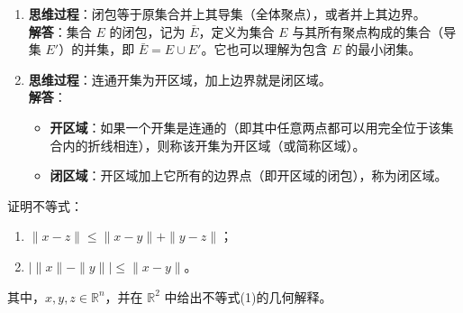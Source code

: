 \documentclass[lang=cn,11pt]{elegantbook}
\begin{document}
\begin{solution}
\begin{enumerate}
  \item[(6)] \textbf{思维过程}：闭包等于原集合并上其导集（全体聚点），或者并上其边界。\\
  \textbf{解答}：集合 $E$ 的闭包，记为 $\bar{E}$，定义为集合 $E$ 与其所有聚点构成的集合（导集 $E'$）的并集，即 $\bar{E} = E \cup E'$。它也可以理解为包含 $E$ 的最小闭集。

  \item[(7)] \textbf{思维过程}：连通开集为开区域，加上边界就是闭区域。\\
  \textbf{解答}：
  \begin{itemize}
    \item \textbf{开区域}：如果一个开集是连通的（即其中任意两点都可以用完全位于该集合内的折线相连），则称该开集为开区域（或简称区域）。
    \item \textbf{闭区域}：开区域加上它所有的边界点（即开区域的闭包），称为闭区域。
  \end{itemize}
\end{enumerate}
\end{solution}

\begin{exercise}[范数不等式的证明与几何意义]
证明不等式：
\begin{enumerate}
  \item[(1)] $\|x-z\| \leqslant  \|x-y\| + \|y-z\|$；
  \item[(2)] $|\|x\| - \|y\|| \leqslant  \|x-y\|$。
\end{enumerate}
其中，$x,y,z \in \mathbb{R}^n$，并在 $\mathbb{R}^2$ 中给出不等式(1)的几何解释。
\end{exercise}
\end{document}
